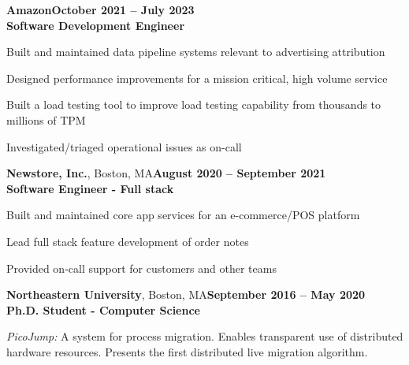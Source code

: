 \documentclass[10pt,margin,line]{resume}
\begin{document}
\begin{resume}
\begin{small}
\textbf{Amazon}\hfill\textbf{October 2021 -- July 2023}\\
\textbf{Software Development Engineer}\hfill
\vspace{-3mm}\\\vspace{-1mm}
\begin{list2}
    \item Built and maintained data pipeline systems relevant to advertising attribution
    \item Designed performance improvements for a mission critical, high volume service
    \item Built a load testing tool to improve load testing capability from thousands to millions of TPM
    \item Investigated/triaged operational issues as on-call
\end{list2}


\textbf{Newstore, Inc.}, Boston, MA\hfill\textbf{August 2020 -- September 2021}\\
\textbf{Software Engineer - Full stack}\hfill
\vspace{-3mm}\\\vspace{-1mm}
\begin{list2}
	\item Built and maintained core app services for an e-commerce/POS platform
    \item Lead full stack feature development of order notes
    \item Provided on-call support for customers and other teams
\end{list2}

\textbf{Northeastern University}, Boston, MA\hfill\textbf{September 2016 -- May 2020}\\
\textbf{Ph.D. Student - Computer Science}\hfill 
\vspace{-3mm}\\\vspace{-1mm}
\begin{list2}
	\item \filbreak\textit{PicoJump:} A system for process migration. Enables transparent use of distributed hardware resources. Presents the first distributed live migration algorithm.
\end{list2}


\end{small}
\end{resume}
\end{document}
